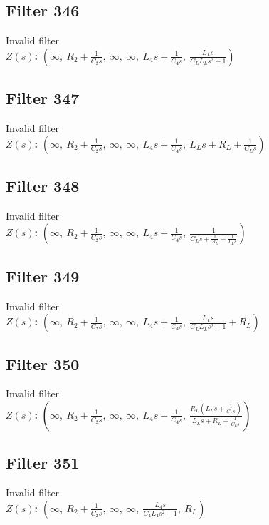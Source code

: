 \documentclass{article}
\begin{document}
\subsection*{Filter 346}
Invalid filter \\ 
\textbf{$Z(s)$:} $\left( \infty, \  R_{2} + \frac{1}{C_{2} s}, \  \infty, \  \infty, \  L_{4} s + \frac{1}{C_{4} s}, \  \frac{L_{L} s}{C_{L} L_{L} s^{2} + 1}\right)$ \\ 
\subsection*{Filter 347}
Invalid filter \\ 
\textbf{$Z(s)$:} $\left( \infty, \  R_{2} + \frac{1}{C_{2} s}, \  \infty, \  \infty, \  L_{4} s + \frac{1}{C_{4} s}, \  L_{L} s + R_{L} + \frac{1}{C_{L} s}\right)$ \\ 
\subsection*{Filter 348}
Invalid filter \\ 
\textbf{$Z(s)$:} $\left( \infty, \  R_{2} + \frac{1}{C_{2} s}, \  \infty, \  \infty, \  L_{4} s + \frac{1}{C_{4} s}, \  \frac{1}{C_{L} s + \frac{1}{R_{L}} + \frac{1}{L_{L} s}}\right)$ \\ 
\subsection*{Filter 349}
Invalid filter \\ 
\textbf{$Z(s)$:} $\left( \infty, \  R_{2} + \frac{1}{C_{2} s}, \  \infty, \  \infty, \  L_{4} s + \frac{1}{C_{4} s}, \  \frac{L_{L} s}{C_{L} L_{L} s^{2} + 1} + R_{L}\right)$ \\ 
\subsection*{Filter 350}
Invalid filter \\ 
\textbf{$Z(s)$:} $\left( \infty, \  R_{2} + \frac{1}{C_{2} s}, \  \infty, \  \infty, \  L_{4} s + \frac{1}{C_{4} s}, \  \frac{R_{L} \left(L_{L} s + \frac{1}{C_{L} s}\right)}{L_{L} s + R_{L} + \frac{1}{C_{L} s}}\right)$ \\ 
\subsection*{Filter 351}
Invalid filter \\ 
\textbf{$Z(s)$:} $\left( \infty, \  R_{2} + \frac{1}{C_{2} s}, \  \infty, \  \infty, \  \frac{L_{4} s}{C_{4} L_{4} s^{2} + 1}, \  R_{L}\right)$ \\ 
\end{document}
